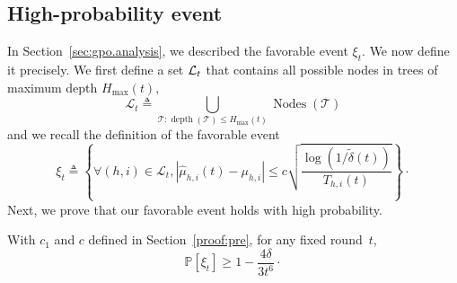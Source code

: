 \subsection{High-probability event}\label{proof:lemma_event}

In Section~\ref{sec:gpo.analysis}, we described the favorable event $\xi_t$.  We now define it precisely. We first define a set $\mathcal{L}_t$ that contains all possible nodes in trees of maximum depth $H_{\max}(t),$
\[
\mathcal{L}_t \triangleq \bigcup\limits_{\mathcal{T}:\operatorname{depth}(\mathcal{T})\leq H_{\max}(t)} \operatorname{Nodes}(\mathcal{T})
\]
and we recall the definition of the favorable event
\[
\xi_t \triangleq \left\{ \forall (h,i)\in\mathcal{L}_t,  |\hat{\mu}_{h,i}(t) - \mu_{h,i}| \leq c\sqrt{\frac{\operatorname{log}(1/\tilde{\delta}(t))}{T_{h,i}(t)}} \right\}\!\cdot\]
Next, we prove that our favorable event holds with high probability.

\begin{lemma} \label{lemma_event}
With $c_1$ and $c$ defined in Section~\ref{proof:pre}, for any fixed round~$t$,
\[
\mathbb{P}\left[ \xi_t \right] \geq 1-\frac{4\delta}{3t^6}\cdot
\]
\end{lemma}


